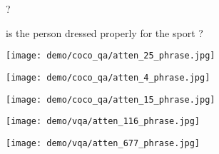 \documentclass{article}
\def \fsize {1pt}
\begin{document}
\begin{figure}[p]
\begin{minipage}{0.19\linewidth}
\begin{center}
{\textcolor[rgb]{0.0000,0.0000,0.7674}{?}
}
\end{center}
\end{minipage}
\begin{minipage}{0.19\linewidth}
\begin{center}
\tiny{
\setlength{\fboxsep}{\fsize}
\textcolor[rgb]{0.0000,0.0000,0.6783}{is}
\textcolor[rgb]{0.0000,0.0000,0.6604}{the}
\textcolor[rgb]{0.0000,0.0000,0.6604}{person}
\textcolor[rgb]{0.2625,1.0000,0.7052}{dressed}
\textcolor[rgb]{0.0000,0.2373,1.0000}{properly}
\textcolor[rgb]{1.0000,0.3638,0.0000}{for}
\textcolor[rgb]{0.0000,0.0000,0.8209}{the}
\textcolor[rgb]{0.0000,0.8176,1.0000}{sport}
\textcolor[rgb]{0.0000,0.0000,0.6604}{?}
}
\end{center}   
\end{minipage}

\begin{minipage}{0.19\linewidth}
\texttt{[image: demo/coco\_qa/atten\_25\_phrase.jpg]}
\end{minipage}
\begin{minipage}{0.19\linewidth}
\texttt{[image: demo/coco\_qa/atten\_4\_phrase.jpg]}
\end{minipage}
\begin{minipage}{0.19\linewidth}
\texttt{[image: demo/coco\_qa/atten\_15\_phrase.jpg]}
\end{minipage}
\begin{minipage}{0.19\linewidth}
\texttt{[image: demo/vqa/atten\_116\_phrase.jpg]}
\end{minipage}
\begin{minipage}{0.19\linewidth}
\texttt{[image: demo/vqa/atten\_677\_phrase.jpg]}
\end{minipage}


\end{figure}
\end{document}
